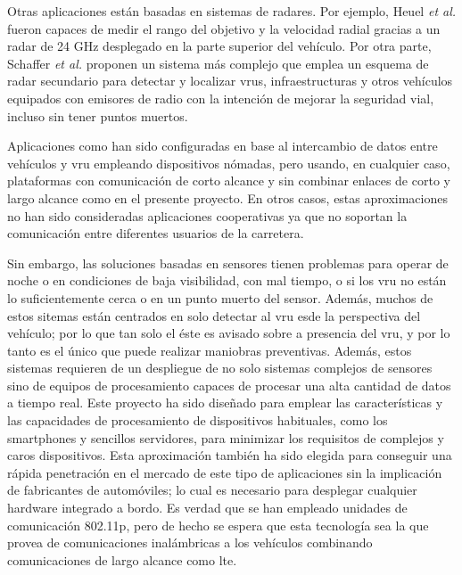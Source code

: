 Otras aplicaciones están basadas en sistemas de radares. Por ejemplo, Heuel
\emph{et al.} \cite{8} fueron capaces de medir el rango del objetivo y la
velocidad radial gracias a un radar de 24 GHz desplegado en la parte superior
del vehículo. Por otra parte, Schaffer \emph{et al.} \cite{9} proponen un
sistema más complejo que emplea un esquema de radar secundario para detectar y
localizar \gls{vru}s, infraestructuras y otros vehículos equipados con emisores
de radio con la intención de mejorar la seguridad vial, incluso sin tener
puntos muertos.

Aplicaciones como \cite{10-12} han sido configuradas en base al intercambio de
datos entre vehículos y \gls{vru} empleando dispositivos nómadas, pero usando,
en cualquier caso, plataformas con comunicación de corto alcance y sin combinar
enlaces de corto y largo alcance como en el presente proyecto. En otros casos,
estas aproximaciones no han sido consideradas aplicaciones cooperativas ya que
no soportan la comunicación entre diferentes usuarios de la carretera.

Sin embargo, las soluciones basadas en sensores tienen problemas para operar
de noche o en condiciones de baja visibilidad, con mal tiempo, o si los
\gls{vru} no están lo suficientemente cerca o en un punto muerto del sensor.
Además, muchos de estos sitemas están centrados en solo detectar al \gls{vru}
esde la perspectiva del vehículo; por lo que tan solo el éste es avisado sobre
a presencia del \gls{vru}, y por lo tanto es el único que puede realizar
maniobras preventivas. Además, estos sistemas requieren de un despliegue de no
solo sistemas complejos de sensores sino de equipos de procesamiento capaces
de procesar una alta cantidad de datos a tiempo real. Este proyecto ha sido
diseñado para emplear las características y las capacidades de procesamiento
de dispositivos habituales, como los smartphones y sencillos servidores, para
minimizar los requisitos de complejos y caros dispositivos. Esta aproximación
también ha sido elegida para conseguir una rápida penetración en el mercado de
este tipo de aplicaciones sin la implicación de fabricantes de automóviles; lo
cual es necesario para desplegar cualquier hardware integrado a bordo. Es
verdad que se han empleado unidades de comunicación \Gls{802.11p}, pero de
hecho se espera que esta tecnología sea la que provea de comunicaciones
inalámbricas a los vehículos combinando comunicaciones de largo alcance como
\gls{lte}\cite{13}.
